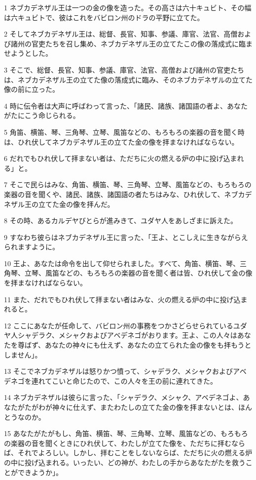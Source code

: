 \par 1 ネブカデネザル王は一つの金の像を造った。その高さは六十キュビト、その幅は六キュビトで、彼はこれをバビロン州のドラの平野に立てた。
\par 2 そしてネブカデネザル王は、総督、長官、知事、参議、庫官、法官、高僧および諸州の官吏たちを召し集め、ネブカデネザル王の立てたこの像の落成式に臨ませようとした。
\par 3 そこで、総督、長官、知事、参議、庫官、法官、高僧および諸州の官吏たちは、ネブカデネザル王の立てた像の落成式に臨み、そのネブカデネザルの立てた像の前に立った。
\par 4 時に伝令者は大声に呼ばわって言った、「諸民、諸族、諸国語の者よ、あなたがたにこう命じられる。
\par 5 角笛、横笛、琴、三角琴、立琴、風笛などの、もろもろの楽器の音を聞く時は、ひれ伏してネブカデネザル王の立てた金の像を拝まなければならない。
\par 6 だれでもひれ伏して拝まない者は、ただちに火の燃える炉の中に投げ込まれる」と。
\par 7 そこで民らはみな、角笛、横笛、琴、三角琴、立琴、風笛などの、もろもろの楽器の音を聞くや、諸民、諸族、諸国語の者たちはみな、ひれ伏して、ネブカデネザル王の立てた金の像を拝んだ。
\par 8 その時、あるカルデヤびとらが進みきて、ユダヤ人をあしざまに訴えた。
\par 9 すなわち彼らはネブカデネザル王に言った、「王よ、とこしえに生きながらえられますように。
\par 10 王よ、あなたは命令を出して仰せられました。すべて、角笛、横笛、琴、三角琴、立琴、風笛などの、もろもろの楽器の音を聞く者は皆、ひれ伏して金の像を拝まなければならない。
\par 11 また、だれでもひれ伏して拝まない者はみな、火の燃える炉の中に投げ込まれると。
\par 12 ここにあなたが任命して、バビロン州の事務をつかさどらせられているユダヤ人シャデラク、メシャクおよびアベデネゴがおります。王よ、この人々はあなたを尊ばず、あなたの神々にも仕えず、あなたの立てられた金の像をも拝もうとしません」。
\par 13 そこでネブカデネザルは怒りかつ憤って、シャデラク、メシャクおよびアベデネゴを連れてこいと命じたので、この人々を王の前に連れてきた。
\par 14 ネブカデネザルは彼らに言った、「シャデラク、メシャク、アベデネゴよ、あなたがたがわが神々に仕えず、またわたしの立てた金の像を拝まないとは、ほんとうなのか。
\par 15 あなたがたがもし、角笛、横笛、琴、三角琴、立琴、風笛などの、もろもろの楽器の音を聞くときにひれ伏して、わたしが立てた像を、ただちに拝むならば、それでよろしい。しかし、拝むことをしないならば、ただちに火の燃える炉の中に投げ込まれる。いったい、どの神が、わたしの手からあなたがたを救うことができようか」。
